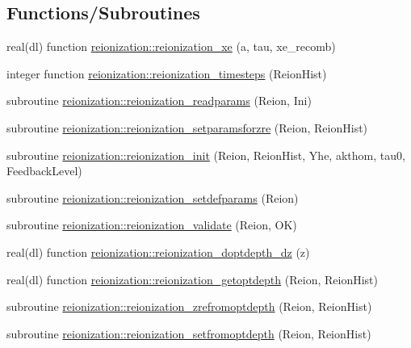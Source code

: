 \subsection*{Functions/\+Subroutines}
\begin{DoxyCompactItemize}
\item 
real(dl) function \mbox{\hyperlink{namespacereionization_a2ed4204b4a8a9400f3e0b3a8f628b584}{reionization\+::reionization\+\_\+xe}} (a, tau, xe\+\_\+recomb)
\item 
integer function \mbox{\hyperlink{namespacereionization_adedd398d9dbfdc65012047bdfe5b9043}{reionization\+::reionization\+\_\+timesteps}} (Reion\+Hist)
\item 
subroutine \mbox{\hyperlink{namespacereionization_a8d8a4a4fcaa0e1adc50de9a45143d2f8}{reionization\+::reionization\+\_\+readparams}} (Reion, Ini)
\item 
subroutine \mbox{\hyperlink{namespacereionization_aee52456a0e9c89ddc33d45ae3d14a484}{reionization\+::reionization\+\_\+setparamsforzre}} (Reion, Reion\+Hist)
\item 
subroutine \mbox{\hyperlink{namespacereionization_a59dc84ce6904020903bfc0ae6f864a27}{reionization\+::reionization\+\_\+init}} (Reion, Reion\+Hist, Yhe, akthom, tau0, Feedback\+Level)
\item 
subroutine \mbox{\hyperlink{namespacereionization_acd4c0417f4ec9bc6d5c9b6bea2b7b035}{reionization\+::reionization\+\_\+setdefparams}} (Reion)
\item 
subroutine \mbox{\hyperlink{namespacereionization_a3b0809c8b733201a4293d2bd47d81398}{reionization\+::reionization\+\_\+validate}} (Reion, OK)
\item 
real(dl) function \mbox{\hyperlink{namespacereionization_a9b89486311458d0dbd526fc233ca5ba5}{reionization\+::reionization\+\_\+doptdepth\+\_\+dz}} (z)
\item 
real(dl) function \mbox{\hyperlink{namespacereionization_a8a3b0a917762ce13033f59ef52fad521}{reionization\+::reionization\+\_\+getoptdepth}} (Reion, Reion\+Hist)
\item 
subroutine \mbox{\hyperlink{namespacereionization_a00f14156cc08a86c4b28e0d21bc7cd2e}{reionization\+::reionization\+\_\+zrefromoptdepth}} (Reion, Reion\+Hist)
\item 
subroutine \mbox{\hyperlink{namespacereionization_a13fb01c3cb03034262b0447b7527aae9}{reionization\+::reionization\+\_\+setfromoptdepth}} (Reion, Reion\+Hist)
\end{DoxyCompactItemize}
